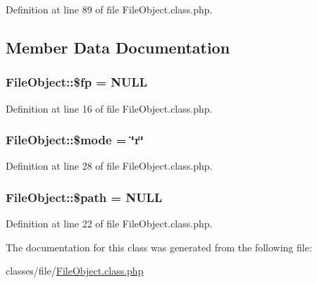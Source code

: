 Definition at line 89 of file File\+Object.\+class.\+php.



\subsection{Member Data Documentation}
\subsubsection[{\texorpdfstring{\$fp}{$fp}}]{\setlength{\rightskip}{0pt plus 5cm}File\+Object\+::\$fp = N\+U\+LL}\hypertarget{classFileObject_a3b4c55272cc7ab0a4e7e79aec6ebfbac}{}\label{classFileObject_a3b4c55272cc7ab0a4e7e79aec6ebfbac}


Definition at line 16 of file File\+Object.\+class.\+php.

\subsubsection[{\texorpdfstring{\$mode}{$mode}}]{\setlength{\rightskip}{0pt plus 5cm}File\+Object\+::\$mode = \char`\"{}r\char`\"{}}\hypertarget{classFileObject_aa4cff8a1b117de6986c0765ae2284dab}{}\label{classFileObject_aa4cff8a1b117de6986c0765ae2284dab}


Definition at line 28 of file File\+Object.\+class.\+php.

\subsubsection[{\texorpdfstring{\$path}{$path}}]{\setlength{\rightskip}{0pt plus 5cm}File\+Object\+::\$path = N\+U\+LL}\hypertarget{classFileObject_aeaea5fd423f0c1349ad151f7da63f0e8}{}\label{classFileObject_aeaea5fd423f0c1349ad151f7da63f0e8}


Definition at line 22 of file File\+Object.\+class.\+php.



The documentation for this class was generated from the following file\+:\begin{DoxyCompactItemize}
\item 
classes/file/\hyperlink{FileObject_8class_8php}{File\+Object.\+class.\+php}\end{DoxyCompactItemize}
